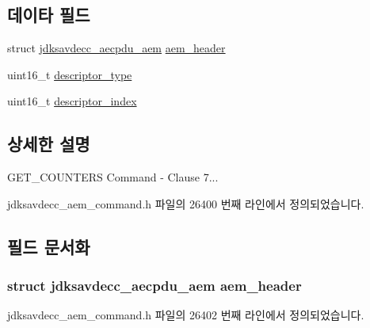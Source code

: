 \subsection*{데이타 필드}
\begin{DoxyCompactItemize}
\item 
struct \hyperlink{structjdksavdecc__aecpdu__aem}{jdksavdecc\+\_\+aecpdu\+\_\+aem} \hyperlink{structjdksavdecc__aem__command__get__counters_ae1e77ccb75ff5021ad923221eab38294}{aem\+\_\+header}
\item 
uint16\+\_\+t \hyperlink{structjdksavdecc__aem__command__get__counters_ab7c32b6c7131c13d4ea3b7ee2f09b78d}{descriptor\+\_\+type}
\item 
uint16\+\_\+t \hyperlink{structjdksavdecc__aem__command__get__counters_a042bbc76d835b82d27c1932431ee38d4}{descriptor\+\_\+index}
\end{DoxyCompactItemize}


\subsection{상세한 설명}
G\+E\+T\+\_\+\+C\+O\+U\+N\+T\+E\+RS Command -\/ Clause 7... 

jdksavdecc\+\_\+aem\+\_\+command.\+h 파일의 26400 번째 라인에서 정의되었습니다.



\subsection{필드 문서화}
\subsubsection[{\texorpdfstring{aem\+\_\+header}{aem_header}}]{\setlength{\rightskip}{0pt plus 5cm}struct {\bf jdksavdecc\+\_\+aecpdu\+\_\+aem} aem\+\_\+header}\hypertarget{structjdksavdecc__aem__command__get__counters_ae1e77ccb75ff5021ad923221eab38294}{}\label{structjdksavdecc__aem__command__get__counters_ae1e77ccb75ff5021ad923221eab38294}


jdksavdecc\+\_\+aem\+\_\+command.\+h 파일의 26402 번째 라인에서 정의되었습니다.

